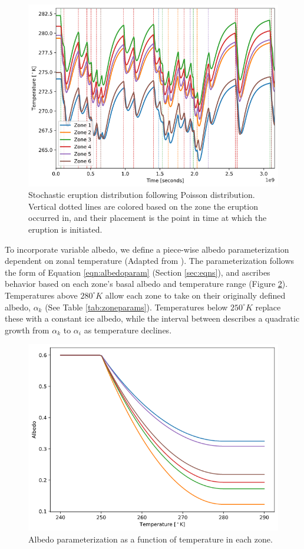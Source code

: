 \documentclass{article}
\begin{document}
\begin{figure}[h]
    \centering
    \includegraphics[scale=0.4]{stocerupt.png}
    \caption{Stochastic eruption distribution following Poisson distribution. Vertical dotted lines are colored based on the zone the eruption occurred in, and their placement is the point in time at which the eruption is initiated.}
    \label{fig:stocherupt}
\end{figure}
\FloatBarrier

To incorporate variable albedo, we define a piece-wise albedo parameterization dependent on zonal temperature (Adapted from \cite{jellinek_ps}). The parameterization follows the form of Equation \ref{eqn:albedoparam} (Section \ref{sec:eqns}), and ascribes behavior based on each zone's basal albedo and temperature range (Figure \ref{fig:albedotemp}). Temperatures above $280^{\circ}K$ allow each zone to take on their originally defined albedo, $\alpha_k$ (See Table \ref{tab:zoneparams}). Temperatures below $250^{\circ}K$ replace these with a constant ice albedo, while the interval between describes a quadratic growth from $\alpha_k$ to $\alpha_i$ as temperature declines.

\begin{figure}[h]
    \centering
    \includegraphics[scale=0.4]{albedotemp.png}
    \caption{Albedo parameterization as a function of temperature in each zone.}
    \label{fig:albedotemp}
\end{figure}
\FloatBarrier
\end{document}
